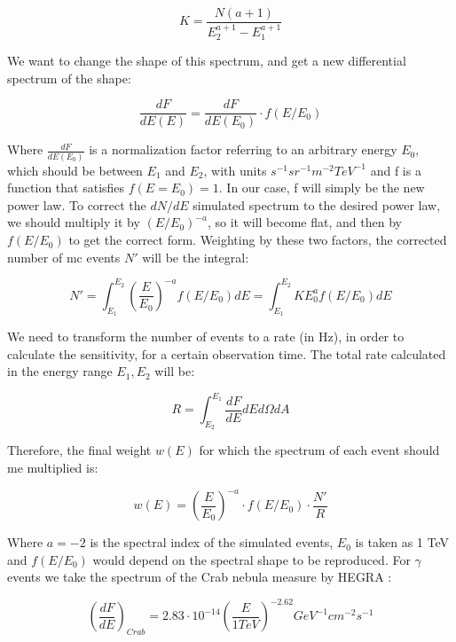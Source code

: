 \documentclass[main.tex]{subfiles}
\begin{document}
\begin{equation}
  K = \frac{N(a+1)}{E_{2}^{a+1}-E_{1}^{a+1}}
\end{equation}

We want to change the shape of this spectrum, and get a new differential spectrum of the shape:

\begin{equation}
  \frac{dF}{dE(E)} = \frac{dF}{dE(E_0)}\cdot f(E/E_0)
\end{equation}

Where $\frac{dF}{dE(E_0)}$ is a normalization factor referring to an arbitrary energy $E_0$, which should be between $E_{1}$ and $E_{2}$, with units $s^{-1}sr^{-1}m^{-2}TeV^{-1}$ and f is a function that satisfies $f(E=E_{0}) = 1$. In our case, f will simply be the new power law. To correct the $dN/dE$  simulated spectrum to the desired power law, we should multiply it by $(E/E_{0})^{-a}$, so it will become flat, and then by $f(E/E_{0})$ to get the correct form. Weighting by these two factors, the corrected number of \gls{mc} events $N'$ will be the integral:

\begin{equation}
  N' = \int^{E_{2}}_{E_{1}} \left(\frac{E}{E_{0}}\right)^{-a} f(E/E_{0}) dE = \int^{E_{2}}_{E_{1}} KE_{0}^{a}f(E/E_{0})dE
\end{equation}

We need to transform the number of events to a rate (in Hz), in order to calculate the sensitivity, for a certain observation time. The total rate calculated in the energy range $E_{1}, E_{2}$ will be:

\begin{equation}
  R = \int^{E_{1}}_{E_{2}} \frac{dF}{dE}dE d\Omega dA
\end{equation}

Therefore, the final weight $w(E)$ for which the spectrum of each event should me multiplied is:

\begin{equation}
  w(E) = \left(\frac{E}{E_0}\right)^{-a}\cdot f(E/E_{0}) \cdot \frac{N'}{R}
\end{equation}

Where $a=-2$ is the spectral index of the simulated events, $E_{0}$ is taken as 1 TeV and $f(E/E_{0})$ would depend on the spectral shape to be reproduced. For $\gamma$ events we take the spectrum of the Crab nebula measure by HEGRA \cite{2004CrabHEGRA}:

\begin{equation}
  \left(\frac{dF}{dE}\right)_{Crab} = 2.83\cdot 10^{-14} \left(\frac{E}{1 TeV}\right)^{-2.62} GeV^{-1}cm^{-2}s^{-1}
\end{equation}
\end{document}
